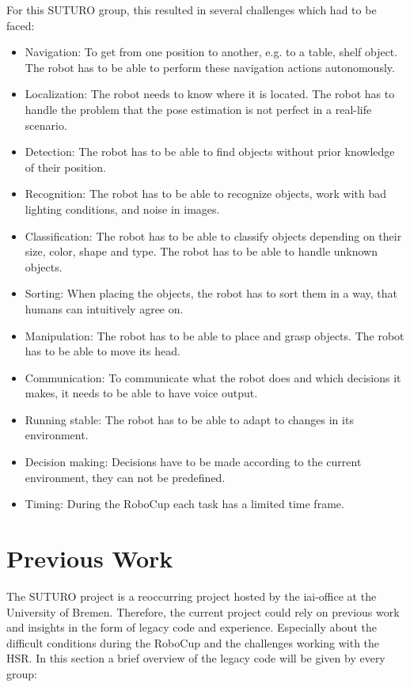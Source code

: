 \documentclass[main.tex]{subfiles}
\begin{document}
	For this SUTURO group, this resulted in several challenges which had to be faced:
	\begin{itemize}
		\item Navigation: To get from one position to another, e.g. to a table, shelf object. The robot has to be able to perform these navigation actions autonomously.
		\item Localization: The robot needs to know where it is located. The robot has to handle the problem that the pose estimation is not perfect in a real-life scenario.
		\item Detection: The robot has to be able to find objects without prior knowledge of their position.
		\item Recognition: The robot has to be able to recognize objects, work with bad lighting conditions, and noise in images.
		\item Classification: The robot has to be able to classify objects depending on their size, color, shape and type. The robot has to be able to handle unknown objects.
		\item Sorting: When placing the objects, the robot has to sort them in a way, that humans can intuitively agree on.
		\item Manipulation: The robot has to be able to place and grasp objects. The robot has to be able to move its head.
		\item Communication: To communicate what the robot does and which decisions it makes, it needs to be able to have voice output.
		\item Running stable: The robot has to be able to adapt to changes in its environment.
		\item Decision making: Decisions have to be made according to the current environment, they can not be predefined. 
		\item Timing: During the RoboCup each task has a limited time frame.
	\end{itemize}

	\section{Previous Work}
    \label{previous_work}
		The SUTURO project is a reoccurring project hosted by the iai-office at the University of Bremen. Therefore, the current project could rely on previous work and insights in the form of legacy code and experience. Especially about the difficult conditions during the RoboCup and the challenges working with the HSR. In this section a brief overview of the legacy code will be given by every group:
\end{document}
